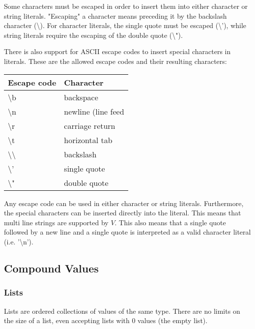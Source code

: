 \documentclass{article}
\begin{document}
\bigskip

Some characters must be escaped in order to insert them into either character or string literals.
"Escaping" a character means preceding it by the backslash character (\textbackslash).
For character literals, the single quote must be escaped (\textbackslash'), while string literals require the escaping of the double quote (\textbackslash").

There is also support for ASCII escape codes to insert special characters in literals.
These are the allowed escape codes and their resulting characters:

\medskip

\begin{tabular}{|l|l|}
  \hline
  \textbf{Escape code} & \textbf{Character}\\
  \hline
  \textbackslash b & backspace\\
  \hline
  \textbackslash n & newline (line feed\\
  \hline
  \textbackslash r & carriage return\\
  \hline
  \textbackslash t & horizontal tab\\
  \hline
  \textbackslash \textbackslash & backslash\\
  \hline
  \textbackslash '  & single quote\\
  \hline
  \textbackslash "  & double quote\\
  \hline
\end{tabular}

\bigskip

Any escape code can be used in either character or string literals.
Furthermore, the special characters can be inserted directly into the literal.
This means that multi line strings are supported by $V$.
This also means that a single quote followed by a new line and a single quote is interpreted as a valid character literal (i.e. '\textbackslash n').

\subsection{Compound Values}

\subsubsection{Lists}

Lists are ordered collections of values of the same type.
There are no limits on the size of a list, even accepting lists with 0 values (the empty list).
\end{document}
